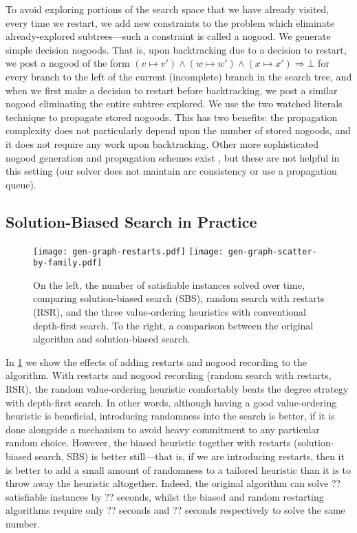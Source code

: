 \documentclass[runningheads]{llncs}
\newcommand{\siplineref}[1]{line~\ref{line:sip:#1}}
\begin{document}
To avoid exploring portions of the search
space that we have already visited, every time we restart, we add new constraints to the problem
which eliminate already-explored subtrees---such a constraint is called a nogood. We generate
simple decision nogoods. That is, upon backtracking due to a decision to restart, we post a nogood
of the form $(v \mapsto v') \wedge (w \mapsto w') \wedge (x \mapsto x') \Rightarrow \bot$ for every
branch to the left of the current (incomplete) branch in the search tree, and when we first make a
decision to restart before backtracking, we post a similar nogood eliminating the entire subtree
explored. We use the two watched literals technique \cite{DBLP:conf/dac/MoskewiczMZZM01} to
propagate stored nogoods.
This has two benefits: the propagation complexity does not particularly depend upon the number of
stored nogoods, and it does not require any work upon backtracking.  Other more sophisticated nogood
generation and propagation schemes exist \cite{DBLP:conf/aaai/LeeSZ16,DBLP:conf/cp/GlorianBLLM17},
but these are not helpful in this setting (our solver does not maintain arc consistency or use a
propagation queue).

\subsection{Solution-Biased Search in Practice}

\begin{figure}[tb]
    \texttt{[image: gen-graph-restarts.pdf]}
    \hfill
    \texttt{[image: gen-graph-scatter-by-family.pdf]}

    \caption{On the left, the number of satisfiable instances solved over time, comparing
    solution-biased search (SBS), random search with restarts (RSR), and the three value-ordering
    heuristics with conventional depth-first search. To the right, a comparison between the original
    algorithm and solution-biased search.}
    \label{figure:old-vs-new}
\end{figure}

In \cref{figure:old-vs-new} we show the effects of adding restarts and nogood recording to the
algorithm. With restarts and nogood recording (random search with restarts, RSR), the random
value-ordering heuristic comfortably beats the degree strategy with depth-first search. In other
words, although having a good value-ordering heuristic is beneficial, introducing randomness into
the search is better, if it is done alongside a mechanism to avoid heavy commitment to any
particular random choice. However, the biased heuristic together
with restarts (solution-biased search, SBS) is better still---that is, if we are introducing
restarts, then it is better to add a small amount of randomness to a tailored heuristic than it is
to throw away the heuristic altogether.  Indeed, the original algorithm can solve ?? satisfiable
instances by ?? seconds, whilst the biased and random restarting algorithms require only ?? seconds
and ?? seconds respectively to solve the same number.
\end{document}
